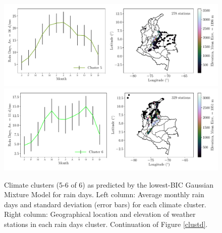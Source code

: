 \documentclass[a4paper,fleqn,usenatbib]{mnras}
\begin{document}
\begin{figure}
\begin{center}
\includegraphics[scale=0.5,trim={0 17 0 18},clip]{gmmd4.pdf}
\includegraphics[scale=0.5,trim={0 17 0 18},clip]{gmmd5.pdf}
\caption{Climate clusters (5-6 of 6) as predicted by the lowest-BIC Gaussian Mixture Model for rain days. Left column: Average monthly rain days and standard deviation (error bars) for each climate cluster. Right column: Geographical location and elevation of weather stations in each rain days cluster. Continuation of Figure \ref{clustd}.}
\end{center}
\end{figure}
\end{document}
